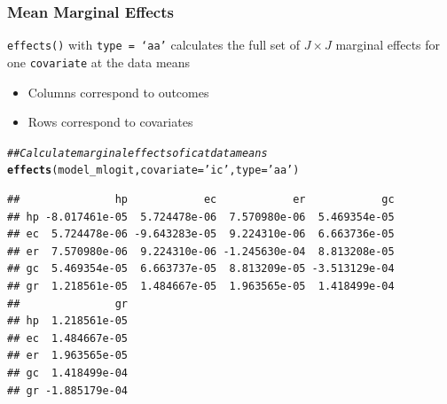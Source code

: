 \documentclass{beamer}\usepackage[]{graphicx}\usepackage[]{color}
\makeatletter
\newcommand{\hlstr}[1]{\textcolor[rgb]{0.192,0.494,0.8}{#1}}%
\newcommand{\hlcom}[1]{\textcolor[rgb]{0.678,0.584,0.686}{\textit{#1}}}%
\newcommand{\hlstd}[1]{\textcolor[rgb]{0.345,0.345,0.345}{#1}}%
\newcommand{\hlkwc}[1]{\textcolor[rgb]{0.333,0.667,0.333}{#1}}%
\newcommand{\hlkwd}[1]{\textcolor[rgb]{0.737,0.353,0.396}{\textbf{#1}}}%
\newenvironment{kframe}{%
 \def\at@end@of@kframe{}%
 \ifinner\ifhmode%
  \def\at@end@of@kframe{\end{minipage}}%
  \begin{minipage}{\columnwidth}%
 \fi\fi%
 \def\FrameCommand##1{\hskip\@totalleftmargin \hskip-\fboxsep
 \colorbox{shadecolor}{##1}\hskip-\fboxsep
     \hskip-\linewidth \hskip-\@totalleftmargin \hskip\columnwidth}%
 \MakeFramed {\advance\hsize-\width
   \@totalleftmargin\z@ \linewidth\hsize
   \@setminipage}}%
 {\par\unskip\endMakeFramed%
 \at@end@of@kframe}
\newenvironment{knitrout}{}{} %
\makeatother
\begin{document}
\begin{frame}[fragile]\frametitle{Mean Marginal Effects}
	  \texttt{effects()} with \texttt{type = `aa'} calculates the full set of $J \times J$ marginal effects for one \texttt{covariate} at the data means
	  \begin{itemize}
        \item Columns correspond to outcomes
        \item Rows correspond to covariates
    \end{itemize}
\begin{knitrout}\footnotesize
{}\color{fgcolor}\begin{kframe}
\begin{alltt}
\hlcom{## Calculate marginal effects of ic at data means}
\hlkwd{effects}\hlstd{(model_mlogit,} \hlkwc{covariate} \hlstd{=} \hlstr{'ic'}\hlstd{,} \hlkwc{type} \hlstd{=} \hlstr{'aa'}\hlstd{)}
\end{alltt}
\begin{verbatim}
##               hp            ec            er            gc
## hp -8.017461e-05  5.724478e-06  7.570980e-06  5.469354e-05
## ec  5.724478e-06 -9.643283e-05  9.224310e-06  6.663736e-05
## er  7.570980e-06  9.224310e-06 -1.245630e-04  8.813208e-05
## gc  5.469354e-05  6.663737e-05  8.813209e-05 -3.513129e-04
## gr  1.218561e-05  1.484667e-05  1.963565e-05  1.418499e-04
##               gr
## hp  1.218561e-05
## ec  1.484667e-05
## er  1.963565e-05
## gc  1.418499e-04
## gr -1.885179e-04
\end{verbatim}
\end{kframe}
\end{knitrout}
\end{frame}
\end{document}
